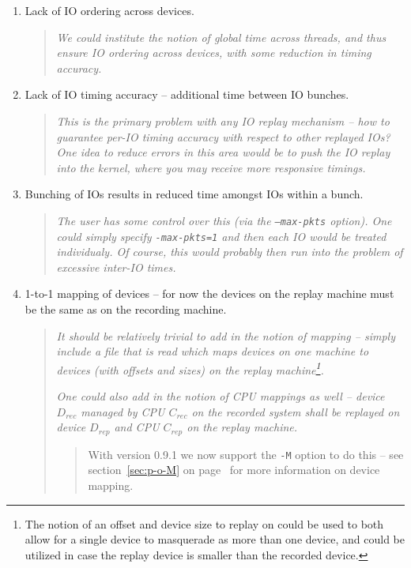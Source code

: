 \documentclass{article}
\begin{document}
\begin{enumerate}
  \item Lack of IO ordering across devices. 

  \begin{quote}
    \emph{We could institute the notion of global time across threads,
    and thus ensure IO ordering across devices, with some reduction in
    timing accuracy.}
  \end{quote}

  \item Lack of IO timing accuracy -- additional time between IO bunches.

  \begin{quote}
    \emph{This is the primary problem with any IO replay mechanism -- how
    to guarantee per-IO timing accuracy with respect to other replayed IOs?
    One idea to reduce errors in this area would be to push the IO replay
    into the kernel, where you \emph{may} receive more responsive timings.}
  \end{quote}

  \item Bunching of IOs results in reduced time amongst IOs within a bunch.

  \begin{quote}
    \emph{The user has \emph{some} control over this (via the
    \texttt{--max-pkts} option). One \emph{could} simply specify
    \texttt{-max-pkts=1} and then each IO would be treated individualy. Of
    course, this would probably then run into the problem of excessive
    inter-IO times.}
  \end{quote}

  \item 1-to-1 mapping of devices -- for now the devices on the replay
  machine must be the same as on the recording machine. 

  \begin{quote}
    \emph{It should be relatively trivial to add in the notion of
    mapping -- simply include a file that is read which maps devices
    on one machine to devices (with offsets and sizes) on the replay
    machine\footnote{The notion of an offset and device size to replay on
    could be used to both allow for a single device to masquerade as more
    than one device, and could be utilized in case the replay device is
    smaller than the recorded device.}.}
    
    \medskip\emph{One could also add in the notion of CPU mappings as well --
    device $D_{rec}$ managed by CPU $C_{rec}$ on the recorded system
    shall be replayed on device $D_{rep}$ and CPU $C_{rep}$ on the
    replay machine.}

    \bigskip
    \begin{quote}
      With version 0.9.1 we now support the \texttt{-M} option to do this
      -- see section~\ref{sec:p-o-M} on page~\pageref{sec:p-o-M} for more
      information on device mapping.
    \end{quote}
  \end{quote}

\end{enumerate}
\end{document}
